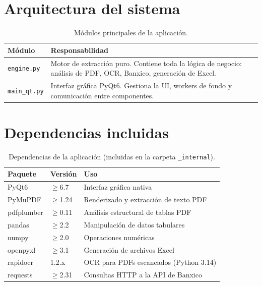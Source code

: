 \documentclass[12pt, a4paper, oneside]{report}
\begin{document}
\section{Arquitectura del sistema}

\begin{table}[H]
  \centering
  \begin{tabularx}{\linewidth}{lX}
    \toprule
    \textbf{Módulo} & \textbf{Responsabilidad} \\
    \midrule
    \texttt{engine.py}   & Motor de extracción puro. Contiene toda la lógica de
                           negocio: análisis de PDF, OCR, Banxico, generación de Excel. \\
    \texttt{main\_qt.py} & Interfaz gráfica PyQt6. Gestiona la UI, workers de fondo
                           y comunicación entre componentes. \\
    \bottomrule
  \end{tabularx}
  \caption{Módulos principales de la aplicación.}
\end{table}

\section{Dependencias incluidas}

\begin{table}[H]
  \centering
  \begin{tabularx}{\linewidth}{llX}
    \toprule
    \textbf{Paquete} & \textbf{Versión} & \textbf{Uso} \\
    \midrule
    PyQt6         & $\geq$6.7  & Interfaz gráfica nativa \\
    PyMuPDF       & $\geq$1.24 & Renderizado y extracción de texto PDF \\
    pdfplumber    & $\geq$0.11 & Análisis estructural de tablas PDF \\
    pandas        & $\geq$2.2  & Manipulación de datos tabulares \\
    numpy         & $\geq$2.0  & Operaciones numéricas \\
    openpyxl      & $\geq$3.1  & Generación de archivos Excel \\
    rapidocr      & 1.2.x      & OCR para PDFs escaneados (Python 3.14) \\
    requests      & $\geq$2.31 & Consultas HTTP a la API de Banxico \\
    \bottomrule
  \end{tabularx}
  \caption{Dependencias de la aplicación (incluidas en la carpeta \texttt{\_internal}).}
\end{table}
\end{document}
